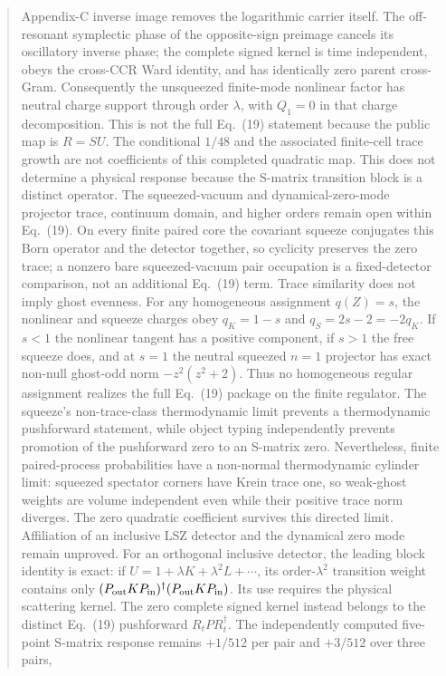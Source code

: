 \documentclass[11pt]{article}
\theoremstyle{definition}
\theoremstyle{remark}
\begin{document}
\begin{abstract}
Appendix-C inverse image removes the logarithmic carrier itself.  The
off-resonant symplectic phase of the opposite-sign preimage cancels its
oscillatory inverse phase; the complete signed kernel is time independent,
obeys the cross-CCR Ward identity, and has identically zero parent cross-Gram.
Consequently the unsqueezed finite-mode nonlinear factor has neutral charge
support through order $\lambda$, with $Q_1=0$ in that charge decomposition.
This is not the full Eq.~(19) statement because the public map is
$R=S U$.  The conditional $1/48$ and the
associated finite-cell trace growth are not coefficients of this completed
quadratic map.  This does not determine a physical response because the
S-matrix transition block is a distinct operator.  The squeezed-vacuum and
dynamical-zero-mode projector trace, continuum domain, and higher orders
remain open within Eq.~(19).
On every finite paired core the covariant squeeze conjugates this Born
operator and the detector together, so cyclicity preserves the zero trace; a
nonzero bare squeezed-vacuum pair occupation is a fixed-detector comparison,
not an additional Eq.~(19) term.  Trace similarity does not imply ghost
evenness.  For any homogeneous assignment $q(Z)=s$, the nonlinear and squeeze
charges obey $q_K=1-s$ and $q_S=2s-2=-2q_K$.  If $s<1$ the nonlinear tangent
has a positive component, if $s>1$ the free squeeze does, and at $s=1$ the
neutral squeezed $n=1$ projector has exact non-null ghost-odd norm
$-z^2(z^2+2)$.  Thus no homogeneous regular assignment realizes the full
Eq.~(19) package on the finite regulator.  The squeeze's non-trace-class thermodynamic
limit prevents a thermodynamic pushforward statement, while object typing
independently prevents promotion of the pushforward zero to an S-matrix zero.
Nevertheless, finite paired-process probabilities have a non-normal
thermodynamic cylinder limit: squeezed spectator corners have Krein trace one,
so weak-ghost weights are volume independent even while their positive trace
norm diverges.  The zero quadratic coefficient survives this directed limit.
Affiliation of an inclusive LSZ detector and the dynamical zero mode remain
unproved.
For an orthogonal inclusive detector, the leading block identity is exact: if
$U=1+\lambda K+\lambda^2L+\cdots$, its order-$\lambda^2$ transition weight
contains only $(P_{\rm out}KP_{\rm in})^\dagger
(P_{\rm out}KP_{\rm in})$.  Its use requires the physical scattering kernel.
The zero complete signed kernel instead belongs to the distinct Eq.~(19)
pushforward $R_tP R_t^\dagger$.  The independently computed five-point
S-matrix response remains $+1/512$ per pair and $+3/512$ over three pairs,

\end{abstract}
\end{document}
